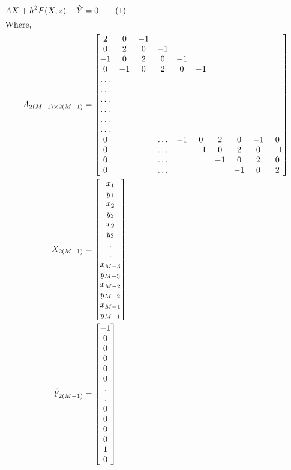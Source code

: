 \documentclass[twoside,12pt]{article}
\newcommand\numberthis{\addtocounter{equation}{1}\tag{\theequation}}
\begin{document}
\begin{align*}
 AX +h^2 F(X,z) - \hat{Y} &= 0\numberthis\label{p1_9}\\
 \intertext{Where,}
 A_{2(M-1)\times2(M-1)} &= \begin{bmatrix}
 2&0&-1\\
 0&2&0&-1\\
 -1&0&2&0&-1\\
 0&-1&0&2&0&-1\\
 \dots\\
 \dots\\
 \dots\\
 \dots\\
 \dots\\
 \dots\\
 0&&&\dots&-1&0&2&0&-1&0\\
 0&&&\dots&&-1&0&2&0&-1\\
 0&&&\dots&&&-1&0&2&0\\
 0&&&\dots&&&&-1&0&2\\
 \end{bmatrix}\\
 X_{2(M-1)} &= \begin{bmatrix}
 x_1\\y_1\\x_2\\y_2\\x_2\\y_3\\.\\.\\x_{M-3}\\y_{M-3}\\x_{M-2}\\y_{M-2}\\x_{M-1}\\y_{M-1}\end{bmatrix}\\
 \hat{Y}_{2(M-1)} &= \begin{bmatrix}
 -1\\0\\0\\0\\0\\0\\.\\.\\0\\0\\0\\0\\1\\0\end{bmatrix} \\

\end{align*}
\end{document}
